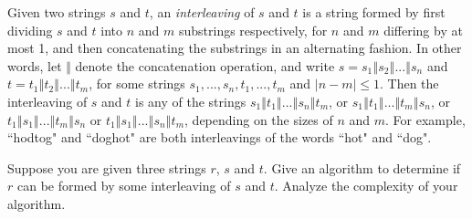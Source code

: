 \problem{}
Given two strings $s$ and $t$, an \emph{interleaving} of $s$ and $t$ is a string formed by first dividing $s$ and $t$ into $n$ and $m$ substrings respectively, for $n$ and $m$ differing by at most 1, and then concatenating the substrings in an alternating fashion.  In other words, let $\mathbin\Vert$ denote the concatenation operation, and write $s = s_1 \mathbin\Vert s_2 \mathbin\Vert ...\mathbin\Vert s_n$ and $t = t_1 \mathbin\Vert t_2 \mathbin\Vert ... \mathbin\Vert t_m$, for some strings $s_1, ..., s_n, t_1, ..., t_m$ and $|n-m| \leq 1$.  Then the interleaving of $s$ and $t$ is any of the strings $s_1 \mathbin\Vert t_1 \mathbin\Vert ... \mathbin\Vert s_n \mathbin\Vert t_m$,  or $s_1 \mathbin\Vert t_1 \mathbin\Vert ... \mathbin\Vert t_m \mathbin\Vert s_n$, or $t_1 \mathbin\Vert s_1 \mathbin\Vert ... \mathbin\Vert t_m \mathbin\Vert s_n$ or $t_1 \mathbin\Vert s_1 \mathbin\Vert ... \mathbin\Vert s_n \mathbin\Vert t_m$, depending on the sizes of $n$ and $m$.  For example, ``hodtog" and ``doghot" are both interleavings of the words ``hot" and ``dog".

Suppose you are given three strings $r$, $s$ and $t$.  Give an algorithm to determine if $r$ can be formed by some interleaving of $s$ and $t$.  Analyze the complexity of your algorithm.

\solution{

}

\newpage
